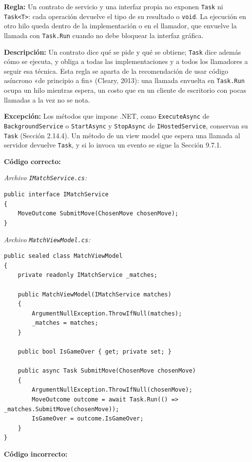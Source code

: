\textbf{Regla:} Un contrato de servicio y una interfaz propia no exponen \texttt{Task} ni \texttt{Task<T>}: cada operación devuelve el tipo de su resultado o \texttt{void}. La ejecución en otro hilo queda dentro de la implementación o en el llamador, que envuelve la llamada con \texttt{Task.Run} cuando no debe bloquear la interfaz gráfica.

\textbf{Descripción:} Un contrato dice qué se pide y qué se obtiene; \texttt{Task} dice además cómo se ejecuta, y obliga a todas las implementaciones y a todos los llamadores a seguir esa técnica. Esta regla se aparta de la recomendación de usar código asíncrono «de principio a fin» (Cleary, 2013): una llamada envuelta en \texttt{Task.Run} ocupa un hilo mientras espera, un costo que en un cliente de escritorio con pocas llamadas a la vez no se nota.

\textbf{Excepción:} Los métodos que impone .NET, como \texttt{ExecuteAsync} de \texttt{BackgroundService} o \texttt{StartAsync} y \texttt{StopAsync} de \texttt{IHostedService}, conservan su \texttt{Task} (Sección 2.14.4). Un método de un view model que espera una llamada al servidor devuelve \texttt{Task}, y si lo invoca un evento se sigue la Sección 9.7.1.

\textbf{Código correcto:}

\textit{Archivo \texttt{IMatchService.cs}:}
\begin{lstlisting}[style=csharpstyle]
public interface IMatchService
{
    MoveOutcome SubmitMove(ChosenMove chosenMove);
}
\end{lstlisting}

\textit{Archivo \texttt{MatchViewModel.cs}:}
\begin{lstlisting}[style=csharpstyle,basicstyle=\ttfamily\scriptsize]
public sealed class MatchViewModel
{
    private readonly IMatchService _matches;

    public MatchViewModel(IMatchService matches)
    {
        ArgumentNullException.ThrowIfNull(matches);
        _matches = matches;
    }

    public bool IsGameOver { get; private set; }

    public async Task SubmitMove(ChosenMove chosenMove)
    {
        ArgumentNullException.ThrowIfNull(chosenMove);
        MoveOutcome outcome = await Task.Run(() => _matches.SubmitMove(chosenMove));
        IsGameOver = outcome.IsGameOver;
    }
}
\end{lstlisting}

\textbf{Código incorrecto:}

